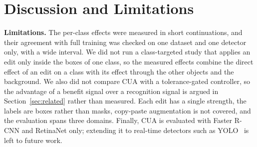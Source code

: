 \begin{figure}[t]
\centering
{}
\caption{}
\label{fig:agreement}
\end{figure}

\begin{table}[t]
\caption{Ablations of CUA on Validation (Faster R-CNN, Three Seeds)}
\label{tab:ablations}
\centering
\footnotesize
{}
\end{table}

\section{Discussion and Limitations}
\label{sec:discussion}


\noindent\textbf{Limitations.} The per-class effects were measured in short continuations, and their agreement with full training was checked on one dataset and one detector only, with a wide interval. We did not run a class-targeted study that applies an edit only inside the boxes of one class, so the measured effects combine the direct effect of an edit on a class with its effect through the other objects and the background. We also did not compare CUA with a tolerance-gated controller, so the advantage of a benefit signal over a recognition signal is argued in Section~\ref{sec:related} rather than measured. Each edit has a single strength, the labels are boxes rather than masks, copy-paste augmentation is not covered, and the evaluation spans three domains. Finally, CUA is evaluated with Faster R-CNN and RetinaNet only; extending it to real-time detectors such as YOLO~\cite{bochkovskiy2020yolov4} is left to future work.

